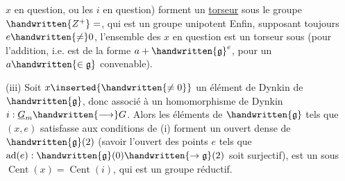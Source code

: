 $x$ en question, ou les $i$ en question) forment un \uline{torseur} sous le groupe $\handwritten{Z^+}=$, qui est un groupe unipotent
Enfin, supposant toujours $e\handwritten{\ne}0$, l'ensemble des $x$ en question est un torseur sous  (pour l'addition, i.e. est de la forme $a+\handwritten{\mathfrak{g}}^e$, pour un $a\handwritten{\in\mathfrak{g}}$ convenable). 

(iii) Soit $x\inserted{\handwritten{\ne0}}$ un élément de Dynkin de $\handwritten{\mathfrak{g}}$, donc associé à un homomorphisme de Dynkin $i:\underline{G}_m\handwritten{\longrightarrow}G$. Alors les éléments de $\handwritten{\mathfrak{g}}$ tels que $(x,e)$ satisfasse aux conditions de (i) forment un ouvert dense de $\handwritten{\mathfrak{g}}(2)$ (savoir l'ouvert des points $e$ tels que $\operatorname{ad}(e):\handwritten{\mathfrak{g}}(0)\handwritten{\to\mathfrak{g}}(2)$ soit surjectif),  est un  sous$\operatorname{Cent}(x)=\operatorname{Cent}(i)$, qui est un groupe réductif.

